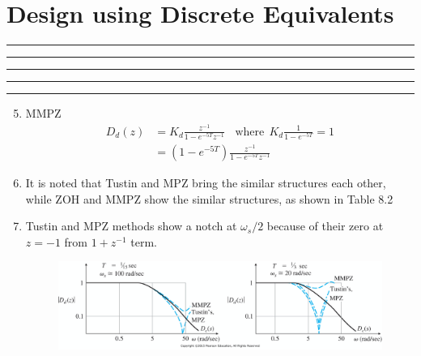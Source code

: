 \setcounter{chapter}{7}
\setcounter{section}{2}
\section{Design using Discrete Equivalents}
\vspace{-8pt} \hrule \hrule \hrule \hrule \hrule  \vspace{12pt}
	\begin{enumerate}
		\setcounter{enumi}{4}
		\item MMPZ
		\begin{align*}
			D_d(z) &= K_d \frac{z^{-1}}{1-e^{-5T}z^{-1}} ~~~~\mbox{where}~~ K_d \frac{1}{1-e^{-5T}} = 1 \\
			&= (1-e^{-5T}) \frac{z^{-1}}{1-e^{-5T}z^{-1}} 
		\end{align*}
		\item It is noted that Tustin and MPZ bring the similar structures each other, while ZOH and MMPZ show the similar structures, as shown in Table 8.2 
		\item Tustin and MPZ methods show a notch at $\omega_s/2$ because of their zero at $z=-1$ from $1+z^{-1}$ term. 
		\begin{figure}[h]
			\centering
			\includegraphics[width=20cm]{./FIG_Franklin/fig8-15.png}
		\end{figure}
	\end{enumerate}		